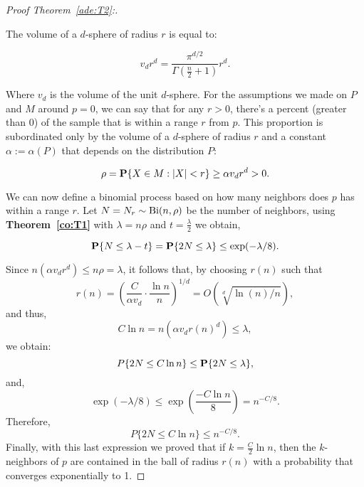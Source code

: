 \begin{proof}[Proof Theorem~\ref{ade:T2}:]\label{ade:T2P}

The volume of a $d$-sphere of radius $r$ is equal to:

\[ v_d r^d = \frac{\pi^{d/2}}{\Gamma(\tfrac{n}{2}+1)} r^d. \]

Where $v_d$ is the volume of the unit $d$-sphere. For the assumptions we made on $P$ and $M$ around $p = 0$, we can say that for any $r > 0$, there's a percent (greater than 0) of the sample that is within a range $r$ from $p$. This proportion is subordinated only by the volume of a $d$-sphere of radius $r$ and a constant $\alpha := \alpha(P)$ that depends on the distribution $P$:

\[ \rho = \P\{X \in M : |X| < r\} \geq \alpha v_d r^d  > 0.  \] 

We can now define a binomial process based on how many neighbors does $p$ has within a range $r$. Let $N = N_r \sim \Bi(n,\rho)$ be the number of neighbors, using \textbf{Theorem~\ref{co:T1}} with $\lambda = n\rho $ and $t = \tfrac{\lambda}{2}$ we obtain,

\[ \P\{N \leq \lambda - t\} = \P\{2N \leq \lambda \} \leq \exp(-\lambda/8). \] 

Since $n(\alpha v_d r^d) \leq n\rho = \lambda$, it follows that, by choosing $r(n)$ such that 
\[ \tag*{($\star$)} r(n) = {\left(\frac{C}{\alpha v_d} \cdot \frac{\ln n}{n} \right)}^{1/d} = O(\sqrt[d]{\ln(n)/n}),\]
and thus,
\[ C \ln n = n(\alpha v_d r{(n)}^d) \leq \lambda,\]
we obtain:
\[P\{2N \leq C \ln n \} \leq \P\{2N \leq \lambda \}, \]
and,
\[\exp(-\lambda/8)  \leq  \exp\left(\frac{-C\ln n}{8}\right) = n^{-C/8}.\]
Therefore,
\[P\{2N \leq C \ln n \} \leq  n^{-C/8}.\]
Finally, with this last expression we proved that if $k = \tfrac{C}{2}\ln n$, then the $k$-neighbors of $p$ are contained in the ball of radius $r(n)$ with a probability that converges exponentially to 1.
\end{proof}